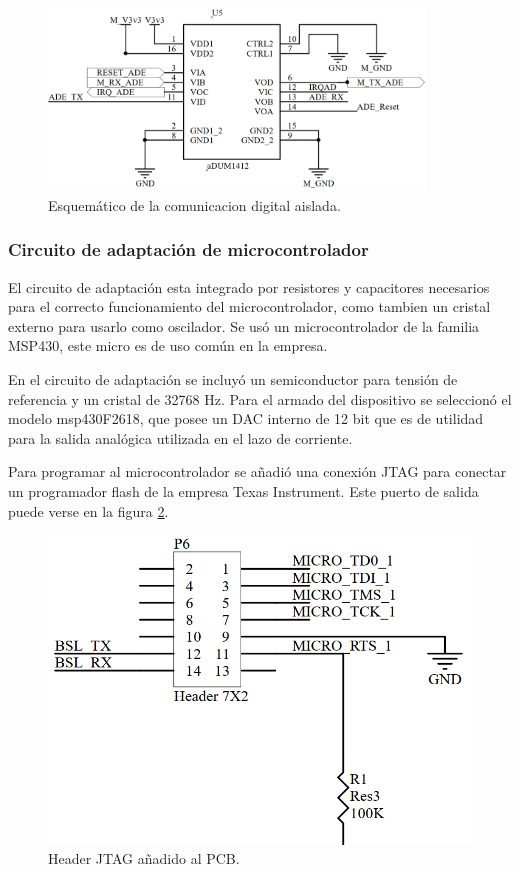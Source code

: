 \begin{figure}[h]
	\centering
	\includegraphics[width=100mm,keepaspectratio]{Figures/comaislado1.png}
	\caption{Esquemático de la comunicacion digital aislada.}
	\label{fig:circaisl2}
\end{figure}

 
\subsubsection{Circuito de adaptación de microcontrolador}

El circuito de adaptación esta integrado por resistores y capacitores necesarios para el correcto funcionamiento del microcontrolador, como tambien un cristal externo para usarlo como oscilador. Se usó un microcontrolador de la familia MSP430, este micro es de uso común en la empresa. 

En el circuito de adaptación se incluyó un semiconductor para tensión de referencia y un cristal de 32768 Hz. Para el armado del dispositivo se seleccionó el modelo msp430F2618, que posee un DAC interno de 12 bit que es de utilidad para la salida analógica utilizada en el lazo de corriente.

Para programar al microcontrolador se añadió una conexión JTAG para conectar un programador flash de la empresa Texas Instrument. Este puerto de salida puede verse en la figura \ref{fig:jitag}.

\begin{figure}[h]
	\centering
	\includegraphics[width=120mm,keepaspectratio]{Figures/JTAG1.png}
	\caption{Header JTAG añadido al PCB.}
	\label{fig:jitag}
\end{figure}

